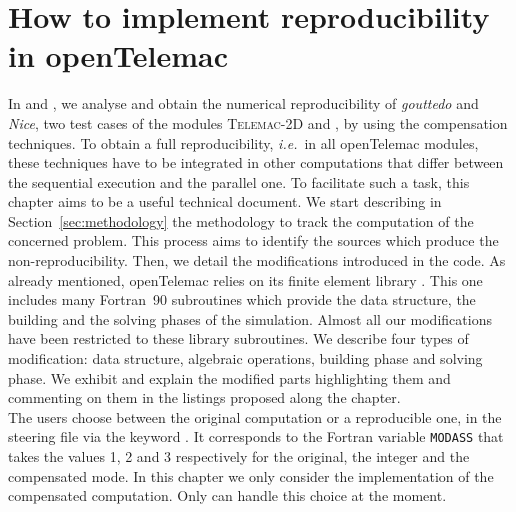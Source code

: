 \newcommand{\red}{\color{red}}
\newcommand{\ie}{{\it i.e.}~}
\newcommand{\Hilight}{\makebox[0pt][l]{\color{babypink}\rule[-2pt]{\linewidth}{10pt}}}
\chapter{How to implement reproducibility in openTelemac}
\label{ref:reprod_guide}
%
%
In \cite{LaND15} and \cite{LaND16}, we analyse and obtain the numerical reproducibility
of \textit{gouttedo} and \textit{Nice}, two test cases of the modules {{\scshape Telemac-2D}\xspace}
and \tomawac, by using the compensation techniques.
To obtain a full reproducibility, \ie in all openTelemac
modules, these techniques have
to be integrated in other computations that differ between the sequential
execution and the parallel one.
To facilitate such a task, this chapter aims to be a useful technical
document.
%
We start describing in Section~\ref{sec:methodology} the methodology to
track the computation of the concerned problem. This process
aims to identify the sources which produce the non-reproducibility.
Then, we detail the modifications introduced in the code.
As already mentioned, openTelemac relies on its finite element library \bief.
This one includes many Fortran~90 subroutines
which provide the data structure, the building and
the solving phases of the simulation.
Almost all our modifications have been restricted
to these library subroutines.
We describe four types of modification: data structure,
algebraic operations, building phase and solving phase.
We exhibit and explain the modified parts highlighting them and commenting on them in
the listings proposed along the chapter.\\
%
%
The users choose between the original computation or a reproducible one,
in the steering file
via the keyword .
It corresponds to the Fortran variable \texttt{MODASS}
that takes the values 1, 2 and 3 respectively for the original,
the integer and the compensated mode.
%
In this chapter we only consider the implementation of
the compensated computation.
Only  can handle this choice at the moment.
%
